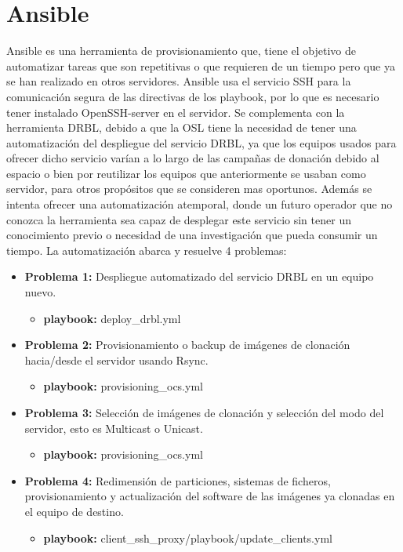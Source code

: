 \newpage
\section{Ansible}

Ansible es una herramienta de provisionamiento que, tiene el objetivo de automatizar tareas que son repetitivas o que requieren de un tiempo pero que ya se han 
realizado en otros servidores. Ansible usa el servicio SSH para la comunicación segura de las directivas de los playbook, por lo que es necesario tener instalado OpenSSH-server en el servidor.
\vspace{5mm}
Se complementa con la herramienta DRBL, debido a que la OSL tiene la necesidad de tener una automatización del despliegue del servicio DRBL, ya que los 
equipos usados para ofrecer dicho servicio varían a lo largo de las campañas de donación debido al espacio o bien por reutilizar los equipos que anteriormente
se usaban como servidor, para otros propósitos que se consideren mas oportunos. Además se intenta ofrecer una automatización atemporal, donde un futuro operador que no conozca 
la herramienta sea capaz de desplegar este servicio sin tener un conocimiento previo o necesidad de una investigación que pueda consumir un tiempo.
\vspace{5mm}
La automatización abarca y resuelve 4 problemas:

\begin{itemize}
	\item \textbf{Problema 1:} Despliegue automatizado del servicio DRBL en un equipo nuevo.
	\begin{itemize}
		\item \textbf{playbook:} deploy\_drbl.yml
	\end{itemize}
	\item \textbf{Problema 2:} Provisionamiento o backup de imágenes de clonación hacia/desde el servidor usando Rsync.
	\begin{itemize}
		\item \textbf{playbook:} provisioning\_ocs.yml
	\end{itemize}
	\item \textbf{Problema 3:} Selección de imágenes de clonación y selección del modo del servidor, esto es Multicast o Unicast.
	\begin{itemize}
		\item \textbf{playbook:} provisioning\_ocs.yml
	\end{itemize}
	\item \textbf{Problema 4:} Redimensión de particiones, sistemas de ficheros, provisionamiento y actualización del software de las imágenes ya clonadas en el equipo de destino.
	\begin{itemize}
		\item \textbf{playbook:} client\_ssh\_proxy/playbook/update\_clients.yml
	\end{itemize}
\end{itemize}

